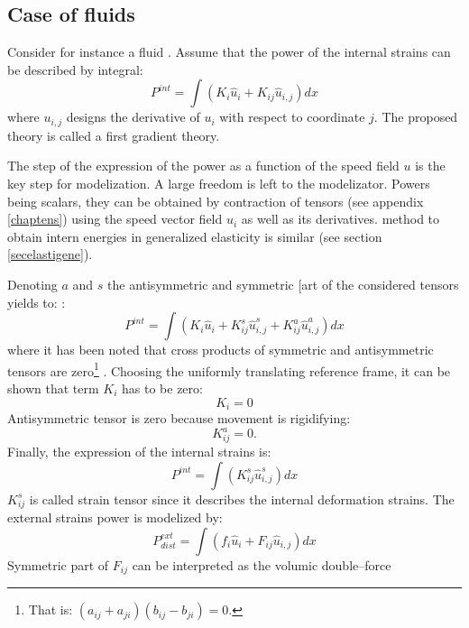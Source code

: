 \documentclass[12pt]{book}
\begin{document}
\subsection{Case of fluids}\label{seccasflu}
Consider for instance a fluid \cite{ma:equad:Dautray1}.  Assume that the power
of the internal strains can be described by integral:
\begin{equation}
P^{int}=\int (K_i\hat{u}_i+K_{ij}\hat{u}_{i,j})dx
\end{equation}
where $u_{i,j}$ designs the derivative of $u_i$ with respect to coordinate
$j$. The proposed theory is called a first gradient theory.
\begin{rem}
The step of the expression of the power as a function of the speed field $u$
is the key step for modelization. A large freedom is left to the
modelizator. Powers being scalars, they can be obtained by contraction of
tensors (see appendix \ref{chaptens}) using the speed vector field $u_i$ as
well as its derivatives. method to obtain intern energies in generalized
elasticity is similar (see section \ref{secelastigene}).
\end{rem}
Denoting $a$ and $s$ the antisymmetric and symmetric [art of the considered
tensors yields to: : 
\begin{equation}
P^{int}=\int
(K_i\hat{u}_i+K^{s}_{ij}\hat{u}^{s}_{i,j}+K^{a}_{ij}\hat{u}^{a}_{i,j})dx
\end{equation}
where it has been noted that cross products of symmetric and antisymmetric
tensors are zero\footnote{%
That is:
$(a_{ij}+a_{ji})(b_{ij}-b_{ji})=0$.
}%
. Choosing the uniformly translating reference frame, it can be shown that term
$K_i$ has to be zero:
\begin{equation}
K_i=0
\end{equation}
Antisymmetric tensor is zero because movement is rigidifying:
\begin{equation}
K^{a}_{ij}=0.
\end{equation}
Finally, the expression of the internal strains is:
\begin{equation}
P^{int}=\int (K^{s}_{ij}\hat{u}^{s}_{i,j})dx
\end{equation}
$K^{s}_{ij}$ is called strain tensor since it describes the internal
deformation strains. The external strains power is modelized by:
\begin{equation}
P^{ext}_{dist}=\int (f_i\hat{u}_i+F_{ij}\hat{u}_{i,j})dx
\end{equation}
Symmetric part of $F_{ij}$ can be interpreted as the volumic double--force
\end{document}
